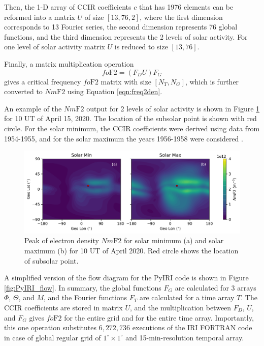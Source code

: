 \documentclass[draft]{agujournal2019}
\begin{document}
Then, the 1-D array of CCIR coefficients $c$ that has 1976 elements can be reformed into a matrix $U$ of size $[13, 76, 2]$, where the first dimension corresponds to 13 Fourier series, the second dimension represents 76 global functions, and the third dimension represents the 2 levels of solar activity. For one level of solar activity matrix $U$ is reduced to size $[13, 76]$.

Finally, a matrix multiplication operation 
\begin{equation}\label{eqn:modip}
fo\mathrm{F2}=(F_D U)F_G
\end{equation}
gives a critical frequency $fo\mathrm{F2}$ matrix with size $[N_T, N_G]$, which is further converted to $Nm\mathrm{F2}$ using Equation \ref{eqn:freq2den}. 

An example of the $Nm\mathrm{F2}$ output for 2 levels of solar activity is shown in Figure \ref{fig:NmF2_min_max} for 10 UT of April 15, 2020. The location of the subsolar point is shown with red circle. For the solar minimum, the CCIR coefficients were derived using data from 1954-1955, and for the solar maximum the years 1956-1958 were considered \cite{Jon62, Jon65, Jon69}. 

\begin{figure}[H]
  \includegraphics[scale=0.7]{PyIRI_NmF2_min_max.pdf}
  \caption{Peak of electron density $Nm\mathrm{F2}$ for solar minimum (a) and solar maximum (b) for 10 UT of April 2020. Red circle shows the location of subsolar point.}
  \label{fig:NmF2_min_max}
\end{figure}

A simplified version of the flow diagram for the PyIRI code is shown in Figure \ref{fig:PyIRI_flow}. In summary, the global functions $F_G$ are calculated for 3 arrays $\Phi$, $\Theta$, and $M$, and the Fourier functions $F_T$ are calculated for a time array $T$. The CCIR coefficients are stored in matrix $U$, and the multiplication between $F_D$, $U$, and $F_G$ gives $fo\mathrm{F2}$ for the entire grid and for the entire time array. Importantly, this one operation substitutes $6,272,736$ executions of the IRI FORTRAN code in case of global regular grid of $1^{\circ} \times 1^{\circ}$ and 15-min-resolution temporal array. 
\end{document}
